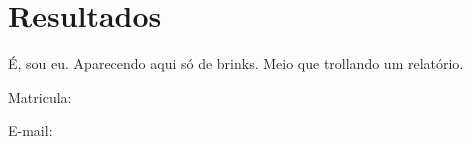\documentclass[journal,compsoc]{IEEEtran}
\begin{document}
	\section{Resultados}\label{resultados}
		

	\ifCLASSOPTIONcaptionsoff
	  \newpage
	\fi







	\begin{IEEEbiography}{\luiz}\label{luiz}
	É, sou eu. Aparecendo aqui só de brinks. Meio que trollando um relatório.
	
	Matricula: \luizmatricula
	
	E-mail: \eluiz
	\end{IEEEbiography}

\appendices
		
		
		
\end{document}
